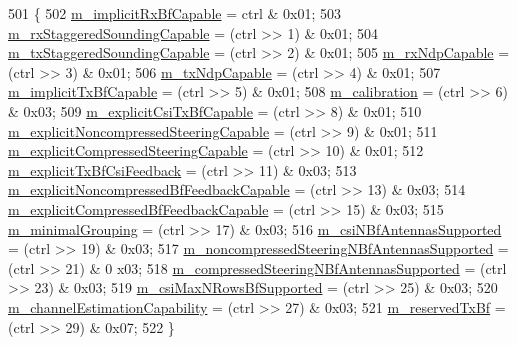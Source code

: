 \begin{DoxyCode}
501 \{
502   \hyperlink{classns3_1_1HtCapabilities_aab2257b1ed21afbdf9461f7279d2467c}{m\_implicitRxBfCapable} = ctrl & 0x01;
503   \hyperlink{classns3_1_1HtCapabilities_a2800a2c035cf78f10fc1bfb9869d8428}{m\_rxStaggeredSoundingCapable} = (ctrl >> 1) & 0x01;
504   \hyperlink{classns3_1_1HtCapabilities_a56b848fe6b83dd90cce1bc79ab9a85a6}{m\_txStaggeredSoundingCapable} = (ctrl >> 2) & 0x01;
505   \hyperlink{classns3_1_1HtCapabilities_a7039be4ac83036eb6b3fc100ee57fcc6}{m\_rxNdpCapable} = (ctrl >> 3) & 0x01;
506   \hyperlink{classns3_1_1HtCapabilities_a7e186a7bc6038344488f66095e186219}{m\_txNdpCapable} = (ctrl >> 4) & 0x01;
507   \hyperlink{classns3_1_1HtCapabilities_a607d92622d4723098cb0f94a1b470660}{m\_implicitTxBfCapable} = (ctrl >> 5) & 0x01;
508   \hyperlink{classns3_1_1HtCapabilities_a0176690dd0f5fd9568b4a8df0f2a587f}{m\_calibration} = (ctrl >> 6) & 0x03;
509   \hyperlink{classns3_1_1HtCapabilities_af74335c78c6c9400e3766c853dd22f7a}{m\_explicitCsiTxBfCapable} = (ctrl >> 8) & 0x01;
510   \hyperlink{classns3_1_1HtCapabilities_aa1b4195b8cbcd9c2d1189e862cfd694b}{m\_explicitNoncompressedSteeringCapable} = (ctrl >> 9) & 0x01;
511   \hyperlink{classns3_1_1HtCapabilities_af8798433f1b66b1d04eb752d362b7fbf}{m\_explicitCompressedSteeringCapable} = (ctrl >> 10) & 0x01;
512   \hyperlink{classns3_1_1HtCapabilities_a6bb0b4be191cae387ee80569df6b376b}{m\_explicitTxBfCsiFeedback} = (ctrl >> 11) & 0x03;
513   \hyperlink{classns3_1_1HtCapabilities_a938d861ca3d9167c3beff00c2664098b}{m\_explicitNoncompressedBfFeedbackCapable} = (ctrl >> 13) & 0x03;
514   \hyperlink{classns3_1_1HtCapabilities_a1ee805003f1223d7c5bbdd74f63612c8}{m\_explicitCompressedBfFeedbackCapable} = (ctrl >> 15) & 0x03;
515   \hyperlink{classns3_1_1HtCapabilities_a5084a740132ff1756aefc28e022e4481}{m\_minimalGrouping} = (ctrl >> 17) & 0x03;
516   \hyperlink{classns3_1_1HtCapabilities_abd07898fcf99ad67706ba00724cd2cd6}{m\_csiNBfAntennasSupported} = (ctrl >> 19) & 0x03;
517   \hyperlink{classns3_1_1HtCapabilities_ae7be4921a53fffad597527cc2b1fceac}{m\_noncompressedSteeringNBfAntennasSupported} = (ctrl >> 21) & 0
      x03;
518   \hyperlink{classns3_1_1HtCapabilities_a20ab9f5b04a077d45eb8182aef0691ef}{m\_compressedSteeringNBfAntennasSupported} = (ctrl >> 23) & 0x03;
519   \hyperlink{classns3_1_1HtCapabilities_a69916bbb030d4c5e9f434e19551bc784}{m\_csiMaxNRowsBfSupported} = (ctrl >> 25) & 0x03;
520   \hyperlink{classns3_1_1HtCapabilities_ab3ba104365acd7bbe1e9596aaea16bbe}{m\_channelEstimationCapability} = (ctrl >> 27) & 0x03;
521   \hyperlink{classns3_1_1HtCapabilities_a292c85ad03ad15416f0256a660e972e3}{m\_reservedTxBf} = (ctrl >> 29) & 0x07;
522 \}
\end{DoxyCode}


